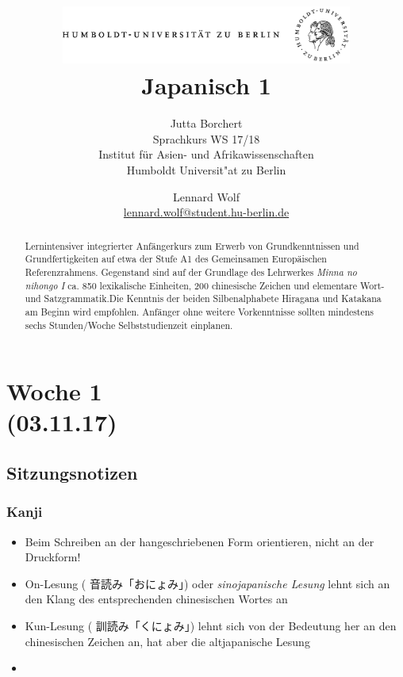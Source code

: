 \documentclass[emulatestandardclasses]{scrartcl}
\date{\vspace{-3ex}}
\begin{document}
\title{
	\includegraphics*[bb=0 0 720 200, width=0.72\textwidth]{ErstesSem/images/hu_logo.png}\\
	\vspace{25pt}
	Japanisch 1}
\subtitle{\vspace{10pt}
			Jutta Borchert\\
			Sprachkurs WS 17/18\\
          Institut für Asien- und Afrikawissenschaften\\ 
          Humboldt Universit"at zu Berlin}
\author{Lennard Wolf\\
        \small{\href{mailto:lennard.wolf@student.hu-berlin.de}{lennard.wolf@student.hu-berlin.de}}}
\maketitle
\begin{abstract}
Lernintensiver integrierter Anfängerkurs zum Erwerb von Grundkenntnissen und Grundfertigkeiten auf etwa der Stufe A1 des Gemeinsamen Europäischen Referenzrahmens. Gegenstand sind auf der Grundlage des Lehrwerkes \emph{Minna no nihongo I} ca. 850 lexikalische Einheiten, 200 chinesische Zeichen und elementare Wort- und Satzgrammatik.Die Kenntnis der beiden Silbenalphabete Hiragana und Katakana am Beginn wird empfohlen. Anfänger ohne weitere Vorkenntnisse sollten mindestens sechs Stunden/Woche Selbststudienzeit einplanen.

\end{abstract}
\newpage

\tableofcontents
\newpage


\section{Woche 1\\(03.11.17)}

\subsection{Sitzungsnotizen}

\subsubsection{Kanji}

\begin{itemize}
  \item Beim Schreiben an der hangeschriebenen Form orientieren, nicht an der Druckform!
  \item On-Lesung ( 音読み「おにょみ」) oder \emph{sinojapanische Lesung} lehnt sich an den Klang des entsprechenden chinesischen Wortes an
  \item Kun-Lesung ( 訓読み「くにょみ」) lehnt sich von der Bedeutung her an den chinesischen Zeichen an, hat aber die altjapanische Lesung
  \item 
\end{itemize}
\end{document}
